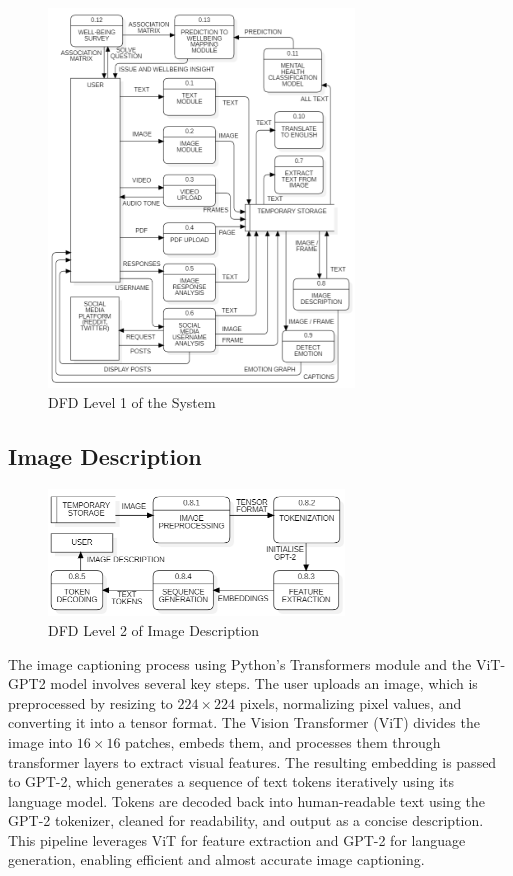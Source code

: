 \begin{figure}[h!]  
    \centering
    \includegraphics[width=0.725\textwidth]{Images/DFD L1.png}  
    \caption{DFD Level 1 of the System}
    \label{dfdl1234}  %
\end{figure}


\subsection{Image Description}

\begin{figure}[h!]  
    \centering
    \includegraphics[width=0.7\textwidth]{Images/DFD L2 ID.png}  
    \caption{DFD Level 2 of Image Description}
    \label{dfdl122}  %
\end{figure}

\noindent
The image captioning process using Python’s Transformers module and the ViT-GPT2 model involves several key steps. The user uploads an image, which is preprocessed by resizing to \(224 \times 224\) pixels, normalizing pixel values, and converting it into a tensor format. The Vision Transformer (ViT) divides the image into \(16 \times 16\) patches, embeds them, and processes them through transformer layers to extract visual features. The resulting embedding is passed to GPT-2, which generates a sequence of text tokens iteratively using its language model. Tokens are decoded back into human-readable text using the GPT-2 tokenizer, cleaned for readability, and output as a concise description. This pipeline leverages ViT for feature extraction and GPT-2 for language generation, enabling efficient and almost accurate image captioning.

